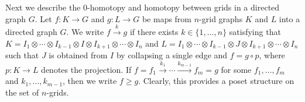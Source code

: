 \documentclass[oneside, 12pt]{amsart}
\numberwithin{equation}{section}
\theoremstyle{plain}
\theoremstyle{definition}
\theoremstyle{remark}
\begin{document}
	
	
	
	Next we describe the 0-homotopy and homotopy between grids in a directed graph $G$. Let $f\colon K\to G$ and $g\colon L\to G$ be maps from $n$-grid graphs $K$ and $L$ into a directed graph $G$. We write $f\xrightarrow{k}g$ if there exists $k\in\{1,\ldots,n\}$ satisfying that $K=I_1\otimes\cdots\otimes I_{k-1}\otimes I\otimes I_{k+1}\otimes\cdots\otimes I_n$ and $L=I_1\otimes\cdots\otimes I_{k-1}\otimes J\otimes I_{k+1}\otimes\cdots\otimes I_n$ such that $J$ is obtained from $I$ by collapsing a single edge and $f=g\circ p$, where $p\colon K\to L$ denotes the projection. If $f=f_1\xrightarrow{k_1}\cdots\xrightarrow{k_{m-1}}f_m=g$ for some $f_1,\ldots,f_m$ and $k_1,\ldots,k_{m-1}$, then we write $f\ge g$. Clearly, this provides a poset structure on the set of $n$-grids.
	
	
	
\end{document}
